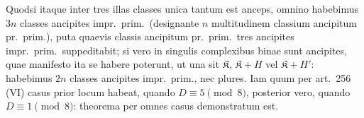 \documentclass[12pt,a4paper]{article}
\theoremstyle{plain}
\theoremstyle{definition}
\theoremstyle{remark}
\theoremstyle{problemstyle}
\begin{document}
Quodsi itaque inter tres illas classes unica tantum est anceps, omnino habebimus $3n$ classes ancipites impr.\ prim.\ (designante $n$ multitudinem classium ancipitum pr.\ prim.), puta quaevis classis ancipitum pr.\ prim.\ tres ancipites impr.\ prim.\ suppeditabit; si vero in singulis complexibus binae sunt ancipites, quae manifesto ita se habere poterunt, ut una sit $\mathfrak{K}$, $\mathfrak{K} + H$ vel $\mathfrak{K} + H'$: habebimus $2n$ classes ancipites impr.\ prim., nec plures. Iam quum per art.\ 256 (VI) casus prior locum habeat, quando $D \equiv 5 \pmod{8}$, posterior vero, quando $D \equiv 1 \pmod{8}$: theorema per omnes casus demonstratum est.
\end{document}
